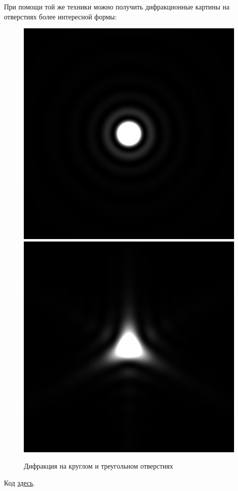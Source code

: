 При помощи той же техники можно получить дифракционные картины на отверстиях более интересной формы:

\begin{figure}[h!]
\center
\includegraphics[width=.3\textwidth]{2015-10-12-difraction-circle.png}
\hfil
\includegraphics[width=.3\textwidth]{2015-10-12-difraction-triangle.png}
\caption{Дифракция на круглом и треугольном отверстиях}
\end{figure}

Код \href{https://github.com/citrux/difraction}{здесь}.

